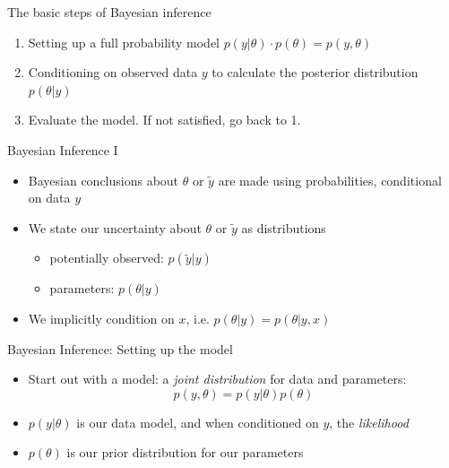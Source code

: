 \documentclass[10pt]{beamer}
\begin{document}
\begin{frame}{The basic steps of Bayesian inference}

  \begin{enumerate}
  \item Setting up a full probability model $p(y|\theta) \cdot p(\theta) = p(y,\theta)$ %
  \pause
  \item Conditioning on observed data $y$ to calculate the posterior distribution $p(\theta|y)$%
  \pause
  \item Evaluate the model. If not satisfied, go back to 1.%
   \end{enumerate}
\end{frame}


\begin{frame}{Bayesian Inference I}
  \begin{itemize}
  \item Bayesian conclusions about $\theta$ or $\tilde{y}$ are made using probabilities, {\color{uured} conditional on data} $y$
  \pause
  \item We state our uncertainty about $\theta$ or $\tilde{y}$ as distributions
  \pause
  \begin{itemize}
    \item potentially observed: $p(\tilde{y}|y)$
    \item parameters: $p(\theta|y)$
  \end{itemize}
  \item We implicitly condition on $x$, i.e. $p(\theta|y) = p(\theta|y, x)$
  \end{itemize}
\end{frame}


\begin{frame}{Bayesian Inference: Setting up the model}
  \begin{itemize}
  \item Start out with a {\color{uured} model}: a \emph{joint distribution} for data and parameters:
  \[
  p(y,\theta) = p(y|\theta) p(\theta)
  \]
  \pause
  \item $p(y|\theta)$ is our data model, and when conditioned on $y$, the \emph{likelihood}
  \pause
  \item $p(\theta)$ is our prior distribution for our parameters
  \end{itemize}
\end{frame}
\end{document}
